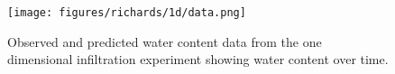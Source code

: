 \begin{figure}[ht]
\begin{center}
\texttt{[image: figures/richards/1d/data.png]}
\end{center}
\caption{
    Observed and predicted water content data from the one dimensional infiltration experiment showing water content over time.
}
\label{fig:richards-1d-data}
\end{figure}
